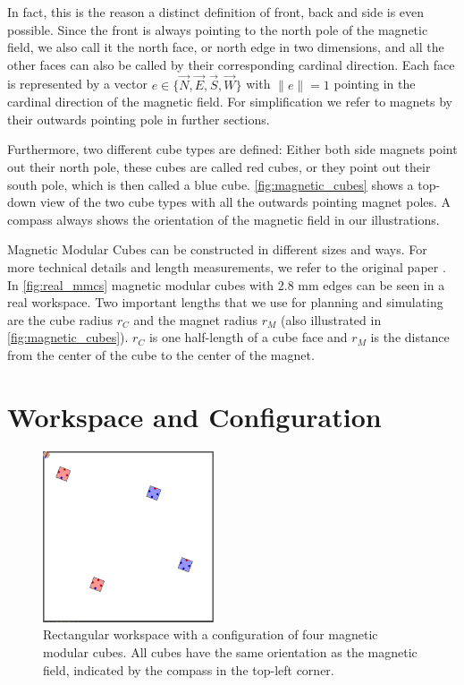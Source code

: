 In fact, this is the reason a distinct definition of front, back and side is even possible.
Since the front is always pointing to the north pole of the magnetic field, we also call it the north face, or north edge in two dimensions, and all the other faces can also be called by their corresponding cardinal direction.
Each face is represented by a vector $e \in \{ \vec{N},\vec{E},\vec{S},\vec{W}\}$ with $\lVert e \rVert = 1$ pointing in the cardinal direction of the magnetic field.
For simplification we refer to magnets by their outwards pointing pole in further sections.

Furthermore, two different cube types are defined:
Either both side magnets point out their north pole, these cubes are called red cubes, or they point out their south pole, which is then called a blue cube.
\autoref{fig:magnetic_cubes} shows a top-down view of the two cube types with all the outwards pointing magnet poles.
A compass always shows the orientation of the magnetic field in our illustrations.

Magnetic Modular Cubes can be constructed in different sizes and ways. For more technical details and length measurements, we refer to the original paper \cite{Bhattacharjee2022}.
In \autoref{fig:real_mmcs} magnetic modular cubes with 2.8 mm edges can be seen in a real workspace.
Two important lengths that we use for planning and simulating are the cube radius $r_C$ and the magnet radius $r_M$ (also illustrated in \autoref{fig:magnetic_cubes}).
$r_C$ is one half-length of a cube face and $r_M$ is the distance from the center of the cube to the center of the magnet.



\section{Workspace and Configuration}

\begin{figure}
	\centering
	\includegraphics[width=0.45\textwidth]{figures/workspace_config.png}
	\caption[Workspace with a configuration of four magnetic modular cubes]{Rectangular workspace with a configuration of four magnetic modular cubes. All cubes have the same orientation as the magnetic field, indicated by the compass in the top-left corner.}
	\label{fig:workspace_config}
\end{figure}


